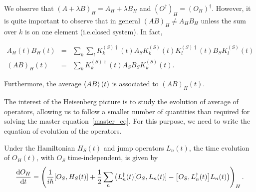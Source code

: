 We observe that $(A + \lambda B)_H = A_H + \lambda B_H$ and $\left(O^\dagger\right)_H = \left(O_H\right)^\dagger$. However, it is quite important to observe that in general $(A B)_H \neq A_H B_H$ unless the sum over $k$ is on one element (i.e.\@ closed system). In fact,

\begin{eqnarray}
    A_H(t) B_H(t) &=& \sum_k \sum_l K^{(S) \dagger}_k(t) A_S K^{(S)}_k(t) K^{(S) \dagger}_l(t) B_S K^{(S)}_l(t)\\
    (A B)_H(t) &=& \sum_k K^{(S) \dagger}_k(t) A_S B_S K^{(S)}_k(t).
\end{eqnarray}

Furthermore, the average $\left\langle A B \right\rangle(t)$ is associated to $(A B)_H(t)$.

The interest of the Heisenberg picture is to study the evolution of average of operators, allowing us to follow a smaller number of quantities than required for solving the master equation~\autoref{master_eq}. For this purpose, we need to write the equation of evolution of the operators.

\begin{theorem} \label{eq_evo_heisen}
    Under the Hamiltonian $H_S(t)$ and jump operators $L_n(t)$, the time evolution of $O_H(t)$, with $O_S$ time-independent, is given by
    \begin{equation} \label{equa-evo_heisen}
        \timeDeriv{O_H} = \left(\ihbar \commutator{O_S}{H_S(t)} + \frac{1}{2} \sum_n \left(L^\dagger_n(t) \commutator{O_S}{L_n(t)}  - \commutator{O_S}{L^\dagger_n(t)} L_n(t) \right)\right)_H.
    \end{equation}
\end{theorem}

